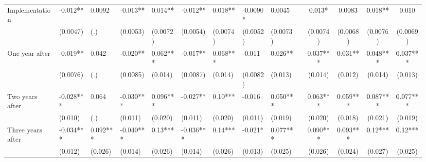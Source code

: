 \begin{tabular}{lccccrrrrrcccc}
Implementation & \multicolumn{1}{l}{-0.012**} & \multicolumn{1}{l}{0.0092} & \multicolumn{1}{l}{-0.013**} & \multicolumn{1}{l}{0.014**} & \multicolumn{1}{l}{-0.012**} & \multicolumn{1}{l}{0.018**} & \multicolumn{1}{l}{-0.0090*} & \multicolumn{1}{l}{0.0045} &       & 0.013* & 0.0083 & 0.018** & 0.010 \\
      & \multicolumn{1}{l}{(0.0047)} & \multicolumn{1}{l}{(.)} & \multicolumn{1}{l}{(0.0053)} & \multicolumn{1}{l}{(0.0072)} & \multicolumn{1}{l}{(0.0054)} & \multicolumn{1}{l}{(0.0074)} & \multicolumn{1}{l}{(0.0052)} & \multicolumn{1}{l}{(0.0073)} &       & (0.0074) & (0.0068) & (0.0076) & (0.0069) \\
One year after & \multicolumn{1}{l}{-0.019**} & \multicolumn{1}{l}{0.042} & \multicolumn{1}{l}{-0.020**} & \multicolumn{1}{l}{0.062***} & \multicolumn{1}{l}{-0.017**} & \multicolumn{1}{l}{0.068***} & \multicolumn{1}{l}{-0.011} & \multicolumn{1}{l}{0.026**} &       & 0.037*** & 0.031** & 0.048*** & 0.037*** \\
      & \multicolumn{1}{l}{(0.0076)} & \multicolumn{1}{l}{(.)} & \multicolumn{1}{l}{(0.0085)} & \multicolumn{1}{l}{(0.014)} & \multicolumn{1}{l}{(0.0087)} & \multicolumn{1}{l}{(0.014)} & \multicolumn{1}{l}{(0.0082)} & \multicolumn{1}{l}{(0.013)} &       & (0.014) & (0.012) & (0.014) & (0.013) \\
Two years after & \multicolumn{1}{l}{-0.028***} & \multicolumn{1}{l}{0.064} & \multicolumn{1}{l}{-0.030***} & \multicolumn{1}{l}{0.096***} & \multicolumn{1}{l}{-0.027**} & \multicolumn{1}{l}{0.10***} & \multicolumn{1}{l}{-0.016} & \multicolumn{1}{l}{0.050***} &       & 0.063*** & 0.059*** & 0.087*** & 0.077*** \\
      & \multicolumn{1}{l}{(0.010)} & \multicolumn{1}{l}{(.)} & \multicolumn{1}{l}{(0.011)} & \multicolumn{1}{l}{(0.020)} & \multicolumn{1}{l}{(0.011)} & \multicolumn{1}{l}{(0.020)} & \multicolumn{1}{l}{(0.011)} & \multicolumn{1}{l}{(0.019)} &       & (0.020) & (0.018) & (0.021) & (0.019) \\
Three years after & \multicolumn{1}{l}{-0.034***} & \multicolumn{1}{l}{0.092***} & \multicolumn{1}{l}{-0.040***} & \multicolumn{1}{l}{0.13***} & \multicolumn{1}{l}{-0.036***} & \multicolumn{1}{l}{0.14***} & \multicolumn{1}{l}{-0.021*} & \multicolumn{1}{l}{0.077***} &       & 0.090*** & 0.093*** & 0.12*** & 0.12*** \\
      & \multicolumn{1}{l}{(0.012)} & \multicolumn{1}{l}{(0.026)} & \multicolumn{1}{l}{(0.014)} & \multicolumn{1}{l}{(0.026)} & \multicolumn{1}{l}{(0.014)} & \multicolumn{1}{l}{(0.026)} & \multicolumn{1}{l}{(0.013)} & \multicolumn{1}{l}{(0.025)} &       & (0.026) & (0.024) & (0.027) & (0.025) \\

\end{tabular}
